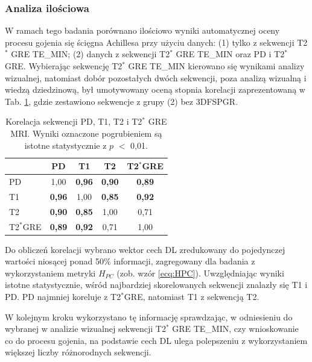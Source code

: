 \subsubsection{Analiza ilościowa} W ramach tego badania porównano ilościowo wyniki automatycznej oceny procesu gojenia się ścięgna Achillesa przy użyciu danych: (1) tylko z sekwencji \linebreak T2$^\ast$ GRE TE\_MIN; (2) danych z sekwencji T2$^\ast$ GRE TE\_MIN oraz PD i T2$^\ast$ GRE. 
Wybierając sekwencję T2$^\ast$ GRE TE\_MIN kierowano się wynikami analizy wizualnej, natomiast dobór pozostałych dwóch sekwencji, poza analizą wizualną i wiedzą dziedzinową, był umotywowany oceną stopnia korelacji zaprezentowaną w Tab. \ref{tab:inter-protocol-corr}, gdzie zestawiono sekwencje z grupy (2) bez 3DFSPGR.
\vspace{10px}
\renewcommand{\arraystretch}{1.2}
\begin{table}[h]
	\centering
	\setlength{\tabcolsep}{12pt}
	\caption{Korelacja sekwencji PD, T1, T2 i T2$^\ast$ GRE MRI. Wyniki oznaczone pogrubieniem są istotne statystycznie z $p$ $<$ 0,01.}
	\label{tab:inter-protocol-corr}
	\begin{tabular}{l||c|c|c|c}
		& PD & T1 & T2 & T2$^\ast$GRE \\ \hline \hline
		PD & 1,00 & \textbf{0,96} & \textbf{0,90} & \textbf{0,89} \\ \hline
		T1 & \textbf{0,96} & 1,00 & \textbf{0,85} & \textbf{0,92} \\ \hline
		T2 & \textbf{0,90} & \textbf{0,85} & 1,00 & 0,71 \\ \hline
		T2$^\ast$GRE & \textbf{0,89} & \textbf{0,92} & 0,71 & 1,00  %
	\end{tabular}
\end{table} 
\renewcommand{\arraystretch}{1}

Do obliczeń korelacji wybrano wektor cech DL zredukowany do pojedynczej wartości niosącej ponad 50\% informacji, zagregowany dla badania z wykorzystaniem metryki $H_{PC}$ (zob. wzór \ref{ecq:HPC}). Uwzględniając wyniki istotne statystycznie, wśród najbardziej skorelowanych sekwencji znalazły się T1 i PD. PD najmniej koreluje \linebreak z T2$^\ast$GRE, natomiast T1 z sekwencją T2. 

W kolejnym kroku wykorzystano tę informację sprawdzając, w odniesieniu \linebreak do wybranej w analizie wizualnej sekwencji T2$^\ast$ GRE TE\_MIN, czy wnioskowanie co do procesu gojenia, na podstawie cech DL ulega polepszeniu z wykorzystaniem większej liczby różnorodnych sekwencji. 

